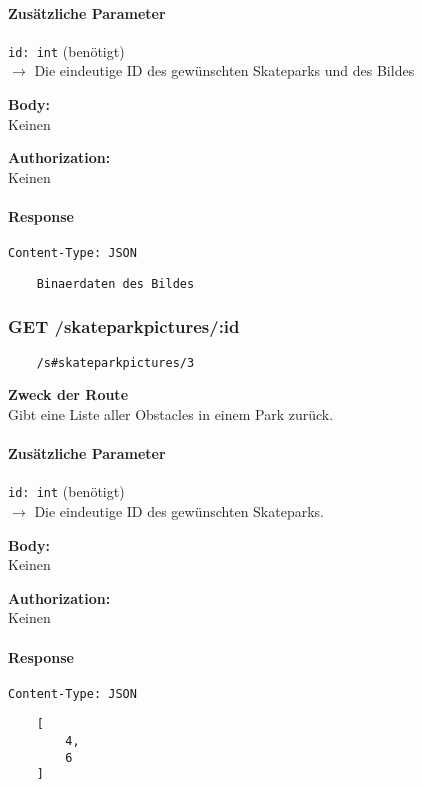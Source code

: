 \paragraph{Zusätzliche Parameter}
\lstinline{id: int} (benötigt) \\
$\rightarrow$ Die eindeutige ID des gewünschten Skateparks und des Bildes


\textbf{Body:} \\
Keinen

\textbf{Authorization:} \\
Keinen

\paragraph{Response }

\lstinline{Content-Type: JSON}
\begin{lstlisting}
    Binaerdaten des Bildes
\end{lstlisting}
\pagebreak

\subsubsection{GET /skateparkpictures/:id}

\begin{lstlisting}
    /s#skateparkpictures/3
\end{lstlisting}

\textbf{Zweck der Route} \\
Gibt eine Liste aller Obstacles in einem Park zurück.




\paragraph{Zusätzliche Parameter}
\lstinline{id: int} (benötigt) \\
$\rightarrow$ Die eindeutige ID des gewünschten Skateparks.


\textbf{Body:} \\
Keinen

\textbf{Authorization:} \\
Keinen

\paragraph{Response }

\lstinline{Content-Type: JSON}
\begin{lstlisting}
    [
        4,
        6    
    ]
\end{lstlisting}
